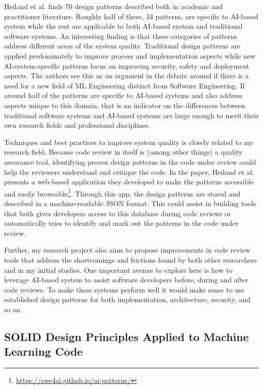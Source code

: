 \documentclass[a4paper,twocolumn]{article}
\begin{document}
Heiland et al. finds 70 design patterns described both in academic and
practitioner literature. Roughly half of these, 34 patterns, are specific to
AI-based system while the rest are applicable to both AI-based system and
traditional software systems. An interesting finding is that these categories of
patterns address different areas of the system quality. Traditional design
patterns are applied predominately to improve process and implementation aspects
while new AI-system-specific patterns focus on improving security, safety and
deployment aspects. The authors see this as an argument in the debate around if
there is a need for a new field of ML Engineering distinct from Software
Engineering. If around half of the patterns are specific to AI-based systems and
also address aspects unique to this domain, that is an indicator on
the differences between traditional software systems and AI-based systems are
large enough to merit their own research fields and professional disciplines.

Techniques and best practices to improve system quality is closely related to my
research field. Because code review in itself is (among other things) a quality
assurance tool, identifying proven design patterns in the code under review
could help the reviewers understand and critique the code. In the paper, Heiland
et al. presents a web-based application they developed to make the patterns
accessible and easily
browsable\footnote{\url{https://swe4ai.github.io/ai-patterns/}}. 
Through this app, the design patterns are stored and described in a
machine-readable JSON format. This could assist in building tools that both
gives developers access to this database during code reviews or automatically
tries to identify and mark out the patterns in the code under review.

Further, my research project also aims to propose improvements in code review
tools that address the shortcomings and frictions found by both other
researchers and in my initial studies. One important avenue to explore here is
how to leverage AI-based system to assist software developers before,
during and after code reviews. To make these systems perform well it would make
sense to use established design patterns for both implementation, architecture,
security, and so on.

\subsection{SOLID Design Principles Applied to Machine Learning Code}
\end{document}
